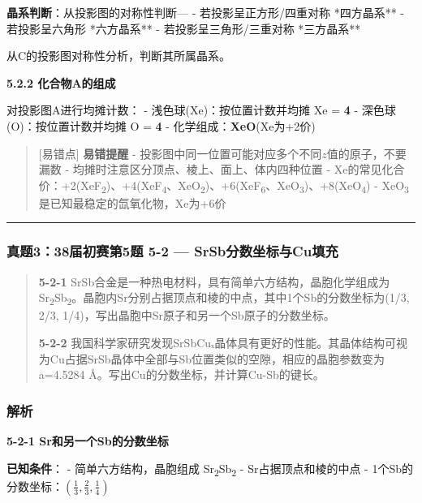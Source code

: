 \textbf{晶系判断}：从投影图的对称性判断---
- 若投影呈正方形/四重对称 \箭 **四方晶系**
- 若投影呈六角形 \箭 **六方晶系**
- 若投影呈三角形/三重对称 \箭 **三方晶系**

从C的投影图对称性分析，判断其所属晶系。

\textbf{5.2.2 化合物A的组成}

对投影图A进行均摊计数：
- 浅色球(Xe)：按位置计数并均摊 \箭 Xe = \textbf{4}
- 深色球(O)：按位置计数并均摊 \箭 O = \textbf{4}
- 化学组成：\textbf{XeO}(Xe为+2价)

\begin{quote}
{[}易错点{]} \textbf{易错提醒}
- 投影图中同一位置可能对应多个不同\(z\)值的原子，不要漏数
- 均摊时注意区分顶点、棱上、面上、体内四种位置
- Xe的常见化合价：+2(XeF\textsubscript{2})、+4(XeF\textsubscript{4}、XeO\textsubscript{2})、+6(XeF\textsubscript{6}、XeO\textsubscript{3})、+8(XeO\textsubscript{4})
- XeO\textsubscript{3}是已知最稳定的氙氧化物，Xe为+6价
\end{quote}

\begin{center}\rule{0.5\linewidth}{0.5pt}\end{center}

\subsubsection{真题3：38届初赛第5题 5-2 --- SrSb分数坐标与Cu填充}\label{ux771fux9898338ux5c4aux521dux8d5bux7b2c5ux9898-5-2-srsbux5206ux6570ux5750ux6807ux4e0ecuux586bux5145}

\begin{quote}
\textbf{5-2-1} SrSb合金是一种热电材料，具有简单六方结构，晶胞化学组成为Sr\textsubscript{2}Sb\textsubscript{2}。晶胞内Sr分别占据顶点和棱的中点，其中1个Sb的分数坐标为(1/3, 2/3, 1/4)，写出晶胞中Sr原子和另一个Sb原子的分数坐标。

\textbf{5-2-2} 我国科学家研究发现SrSbCuₓ晶体具有更好的性能。其晶体结构可视为Cu占据SrSb晶体中全部与Sb位置类似的空隙，相应的晶胞参数变为a=4.5284 Å。写出Cu的分数坐标，并计算Cu-Sb的键长。
\end{quote}

\subsubsection{解析}\label{ux89e3ux6790-16}

\textbf{5-2-1 Sr和另一个Sb的分数坐标}

\textbf{已知条件}：
- 简单六方结构，晶胞组成 Sr\textsubscript{2}Sb\textsubscript{2}
- Sr占据顶点和棱的中点
- 1个Sb的分数坐标：\((\frac{1}{3}, \frac{2}{3}, \frac{1}{4})\)

